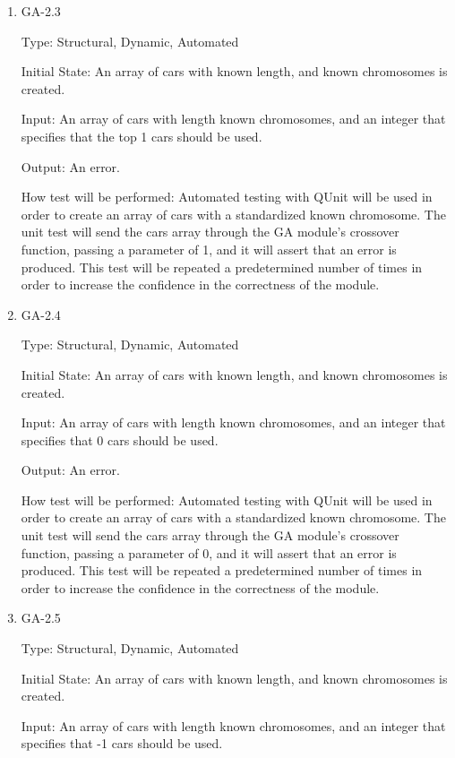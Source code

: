 \documentclass[12pt, titlepage]{article}
\begin{document}
\begin{enumerate}
\item{GA-2.3\\}

Type: Structural, Dynamic, Automated
					
Initial State: An array of cars with known length, and known chromosomes is created.
					
Input: An array of cars with length known chromosomes, and an integer that specifies that the top 1 cars should be used.
					
Output: An error.
					
How test will be performed: Automated testing with QUnit will be used in order to create an array of cars with a standardized known chromosome. The unit test will send the cars array through the GA module's crossover function, passing a parameter of 1, and it will assert that an error is produced. This test will be repeated  a predetermined number of times in order to increase the confidence in the correctness of the module.

\item{GA-2.4\\}

Type: Structural, Dynamic, Automated
					
Initial State: An array of cars with known length, and known chromosomes is created.
					
Input: An array of cars with length known chromosomes, and an integer that specifies that 0 cars should be used.
					
Output: An error.
					
How test will be performed: Automated testing with QUnit will be used in order to create an array of cars with a standardized known chromosome. The unit test will send the cars array through the GA module's crossover function, passing a parameter of 0, and it will assert that an error is produced. This test will be repeated  a predetermined number of times in order to increase the confidence in the correctness of the module.

\item{GA-2.5\\}

Type: Structural, Dynamic, Automated
					
Initial State: An array of cars with known length, and known chromosomes is created.
					
Input: An array of cars with length known chromosomes, and an integer that specifies that -1 cars should be used.
					

\end{enumerate}
\end{document}
